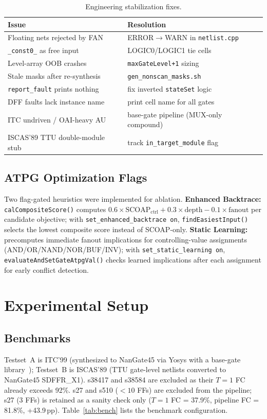 \documentclass[conference]{IEEEtran}
\begin{document}
\begin{table}[t]
\caption{Engineering stabilization fixes.}
\label{tab:fixes}
\centering
\footnotesize
\begin{tabular}{@{}p{4.0cm}p{4.0cm}@{}}
\toprule
Issue & Resolution \\
\midrule
Floating nets rejected by FAN & ERROR$\to$WARN in \texttt{netlist.cpp} \\
\texttt{\_const0\_} as free input & LOGIC0/LOGIC1 tie cells \\
Level-array OOB crashes & \texttt{maxGateLevel+1} sizing \\
Stale masks after re-synthesis & \texttt{gen\_nonscan\_masks.sh} \\
\texttt{report\_fault} prints nothing & fix inverted \texttt{stateSet} logic \\
DFF faults lack instance name & print cell name for all gates \\
ITC undriven / OAI-heavy AU & base-gate pipeline (MUX-only compound) \\
ISCAS'89 TTU double-module stub & track \texttt{in\_target\_module} flag \\
\bottomrule
\end{tabular}
\end{table}

\subsection{ATPG Optimization Flags}
Two flag-gated heuristics were implemented for ablation. \textbf{Enhanced
Backtrace:} \texttt{calCompositeScore()} computes
$0.6{\times}\mathrm{SCOAP}_{\text{ctrl}} + 0.3{\times}\text{depth} -
0.1{\times}\text{fanout}$ per candidate objective; with
\texttt{set\_enhanced\_backtrace on}, \texttt{findEasiestInput()} selects the
lowest composite score instead of SCOAP-only. \textbf{Static Learning:}
precomputes immediate fanout implications for controlling-value assignments
(AND/OR/NAND/NOR/BUF/INV); with \texttt{set\_static\_learning on},
\texttt{evaluateAndSetGateAtpgVal()} checks learned implications after each
assignment for early conflict detection.

\section{Experimental Setup}
\label{sec:setup}

\subsection{Benchmarks}
Testset~A is ITC'99 (synthesized to NanGate45 via Yosys with a base-gate
library~\cite{ref16}); Testset~B is ISCAS'89 (TTU gate-level netlists converted
to NanGate45 SDFFR\_X1). s38417 and s38584 are excluded as their $T{=}1$ FC
already exceeds 92\%. s27 and s510 ($<10$ FFs) are excluded from the pipeline;
s27 (3 FFs) is retained as a sanity check only ($T{=}1$ FC = 37.9\%, pipeline
FC = 81.8\%, +43.9\,pp). Table~\ref{tab:bench} lists the benchmark
configuration.
\end{document}
